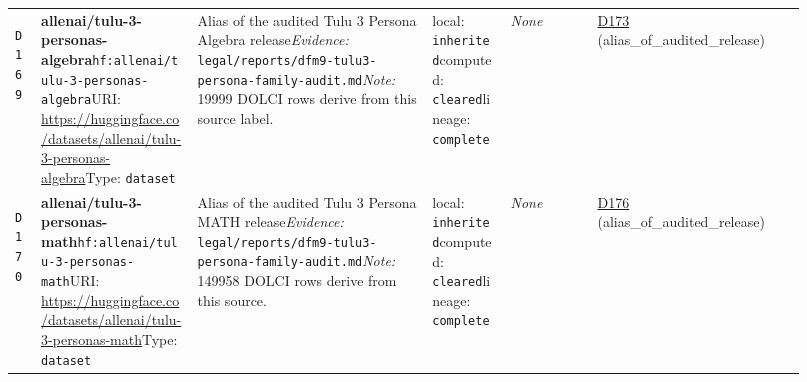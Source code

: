 \documentclass[9pt,a4paper]{article}
\newcommand{\depid}[1]{\hypertarget{dep:#1}{\texttt{#1}}}
\begin{document}
\begin{landscape}
\begin{longtable}{@{}L{0.035\linewidth}L{0.185\linewidth}L{0.27\linewidth}L{0.09\linewidth}L{0.10\linewidth}L{0.24\linewidth}@{}}
\depid{D169} & \textbf{allenai/tulu-3-personas-algebra}\newline \nolinkurl{hf:allenai/tulu-3-personas-algebra}\newline URI: \url{https://huggingface.co/datasets/allenai/tulu-3-personas-algebra}\newline Type: \texttt{dataset} & Alias of the audited Tulu 3 Persona Algebra release\newline \textit{Evidence:} \nolinkurl{legal/reports/dfm9-tulu3-persona-family-audit.md}\newline \textit{Note:} 19999 DOLCI rows derive from this source label. & local: \texttt{inherited}\newline computed: \texttt{cleared}\newline lineage: \texttt{complete} & \textit{None} & \hyperlink{dep:D173}{D173} (alias\_of\_audited\_release) \\
\depid{D170} & \textbf{allenai/tulu-3-personas-math}\newline \nolinkurl{hf:allenai/tulu-3-personas-math}\newline URI: \url{https://huggingface.co/datasets/allenai/tulu-3-personas-math}\newline Type: \texttt{dataset} & Alias of the audited Tulu 3 Persona MATH release\newline \textit{Evidence:} \nolinkurl{legal/reports/dfm9-tulu3-persona-family-audit.md}\newline \textit{Note:} 149958 DOLCI rows derive from this source. & local: \texttt{inherited}\newline computed: \texttt{cleared}\newline lineage: \texttt{complete} & \textit{None} & \hyperlink{dep:D176}{D176} (alias\_of\_audited\_release) \\

\end{longtable}
\end{landscape}
\end{document}
